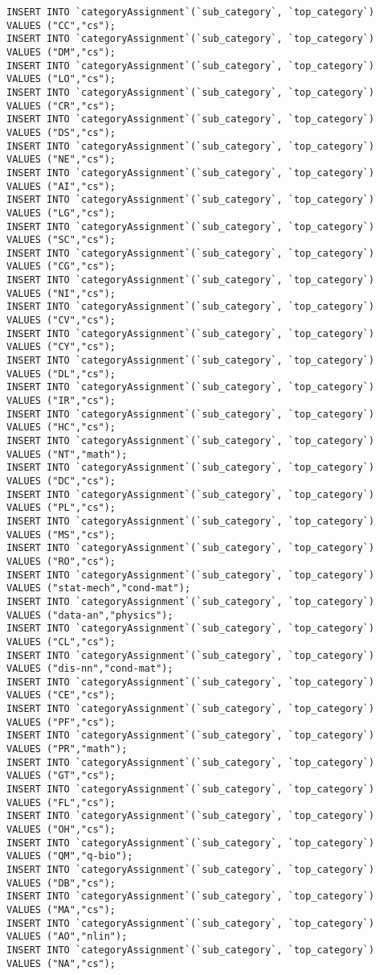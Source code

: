 \documentclass{article}
\begin{document}
	\begin{lstlisting}[style=sql, tabsize=2]
INSERT INTO `categoryAssignment`(`sub_category`, `top_category`) VALUES ("CC","cs");
INSERT INTO `categoryAssignment`(`sub_category`, `top_category`) VALUES ("DM","cs");
INSERT INTO `categoryAssignment`(`sub_category`, `top_category`) VALUES ("LO","cs");
INSERT INTO `categoryAssignment`(`sub_category`, `top_category`) VALUES ("CR","cs");
INSERT INTO `categoryAssignment`(`sub_category`, `top_category`) VALUES ("DS","cs");
INSERT INTO `categoryAssignment`(`sub_category`, `top_category`) VALUES ("NE","cs");
INSERT INTO `categoryAssignment`(`sub_category`, `top_category`) VALUES ("AI","cs");
INSERT INTO `categoryAssignment`(`sub_category`, `top_category`) VALUES ("LG","cs");
INSERT INTO `categoryAssignment`(`sub_category`, `top_category`) VALUES ("SC","cs");
INSERT INTO `categoryAssignment`(`sub_category`, `top_category`) VALUES ("CG","cs");
INSERT INTO `categoryAssignment`(`sub_category`, `top_category`) VALUES ("NI","cs");
INSERT INTO `categoryAssignment`(`sub_category`, `top_category`) VALUES ("CV","cs");
INSERT INTO `categoryAssignment`(`sub_category`, `top_category`) VALUES ("CY","cs");
INSERT INTO `categoryAssignment`(`sub_category`, `top_category`) VALUES ("DL","cs");
INSERT INTO `categoryAssignment`(`sub_category`, `top_category`) VALUES ("IR","cs");
INSERT INTO `categoryAssignment`(`sub_category`, `top_category`) VALUES ("HC","cs");
INSERT INTO `categoryAssignment`(`sub_category`, `top_category`) VALUES ("NT","math");
INSERT INTO `categoryAssignment`(`sub_category`, `top_category`) VALUES ("DC","cs");
INSERT INTO `categoryAssignment`(`sub_category`, `top_category`) VALUES ("PL","cs");
INSERT INTO `categoryAssignment`(`sub_category`, `top_category`) VALUES ("MS","cs");
INSERT INTO `categoryAssignment`(`sub_category`, `top_category`) VALUES ("RO","cs");
INSERT INTO `categoryAssignment`(`sub_category`, `top_category`) VALUES ("stat-mech","cond-mat");
INSERT INTO `categoryAssignment`(`sub_category`, `top_category`) VALUES ("data-an","physics");
INSERT INTO `categoryAssignment`(`sub_category`, `top_category`) VALUES ("CL","cs");
INSERT INTO `categoryAssignment`(`sub_category`, `top_category`) VALUES ("dis-nn","cond-mat");
INSERT INTO `categoryAssignment`(`sub_category`, `top_category`) VALUES ("CE","cs");
INSERT INTO `categoryAssignment`(`sub_category`, `top_category`) VALUES ("PF","cs");
INSERT INTO `categoryAssignment`(`sub_category`, `top_category`) VALUES ("PR","math");
INSERT INTO `categoryAssignment`(`sub_category`, `top_category`) VALUES ("GT","cs");
INSERT INTO `categoryAssignment`(`sub_category`, `top_category`) VALUES ("FL","cs");
INSERT INTO `categoryAssignment`(`sub_category`, `top_category`) VALUES ("OH","cs");
INSERT INTO `categoryAssignment`(`sub_category`, `top_category`) VALUES ("QM","q-bio");
INSERT INTO `categoryAssignment`(`sub_category`, `top_category`) VALUES ("DB","cs");
INSERT INTO `categoryAssignment`(`sub_category`, `top_category`) VALUES ("MA","cs");
INSERT INTO `categoryAssignment`(`sub_category`, `top_category`) VALUES ("AO","nlin");
INSERT INTO `categoryAssignment`(`sub_category`, `top_category`) VALUES ("NA","cs");
	\end{lstlisting}
\end{document}
